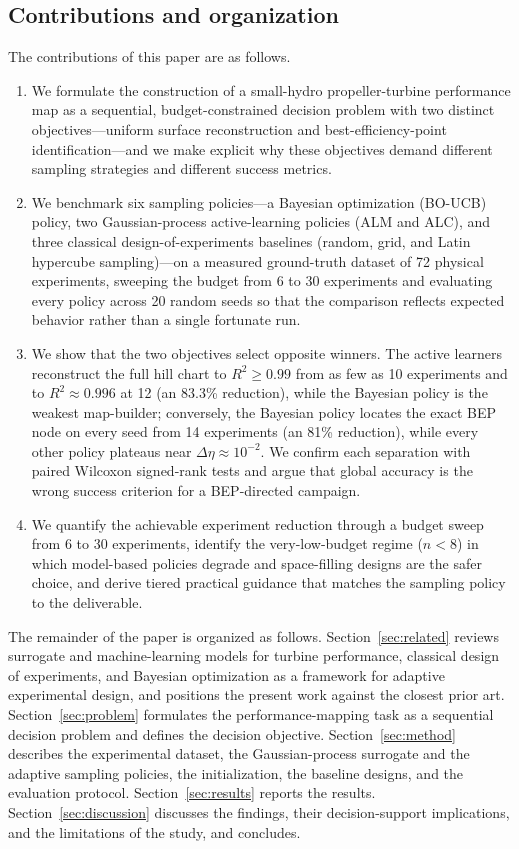 \documentclass[preprint,12pt]{elsarticle}
\begin{document}
\subsection{Contributions and organization}
The contributions of this paper are as follows.
\begin{enumerate}
\item We formulate the construction of a small-hydro propeller-turbine performance
map as a sequential, budget-constrained decision problem with two distinct
objectives---uniform surface reconstruction and best-efficiency-point
identification---and we make explicit why these objectives demand different sampling
strategies and different success metrics.
\item We benchmark six sampling policies---a Bayesian optimization (BO-UCB) policy,
two Gaussian-process active-learning policies (ALM and ALC), and three classical
design-of-experiments baselines (random, grid, and Latin hypercube sampling)---on a
measured ground-truth dataset of 72 physical experiments, sweeping the budget from 6
to 30 experiments and evaluating every policy across 20 random seeds so that the
comparison reflects expected behavior rather than a single fortunate run.
\item We show that the two objectives select opposite winners. The active learners
reconstruct the full hill chart to $R^2 \geq 0.99$ from as few as 10 experiments and
to $R^2 \approx 0.996$ at 12 (an 83.3\% reduction), while the Bayesian policy is the
weakest map-builder; conversely, the Bayesian policy locates the exact BEP node on
every seed from 14 experiments (an 81\% reduction), while every other policy plateaus
near $\Delta\eta \approx 10^{-2}$. We confirm each separation with paired Wilcoxon
signed-rank tests and argue that global accuracy is the wrong success criterion for a
BEP-directed campaign.
\item We quantify the achievable experiment reduction through a budget sweep from 6
to 30 experiments, identify the very-low-budget regime ($n < 8$) in which
model-based policies degrade and space-filling designs are the safer choice, and
derive tiered practical guidance that matches the sampling policy to the deliverable.
\end{enumerate}
The remainder of the paper is organized as follows. Section~\ref{sec:related}
reviews surrogate and machine-learning models for turbine performance, classical
design of experiments, and Bayesian optimization as a framework for adaptive
experimental design, and positions the present work against the closest prior art.
Section~\ref{sec:problem} formulates the performance-mapping task as a sequential
decision problem and defines the decision objective. Section~\ref{sec:method}
describes the experimental dataset, the Gaussian-process surrogate and the adaptive
sampling policies, the initialization, the baseline designs, and the evaluation
protocol. Section~\ref{sec:results} reports the results. Section~\ref{sec:discussion}
discusses the findings, their decision-support implications, and the limitations of
the study, and concludes.
\end{document}
